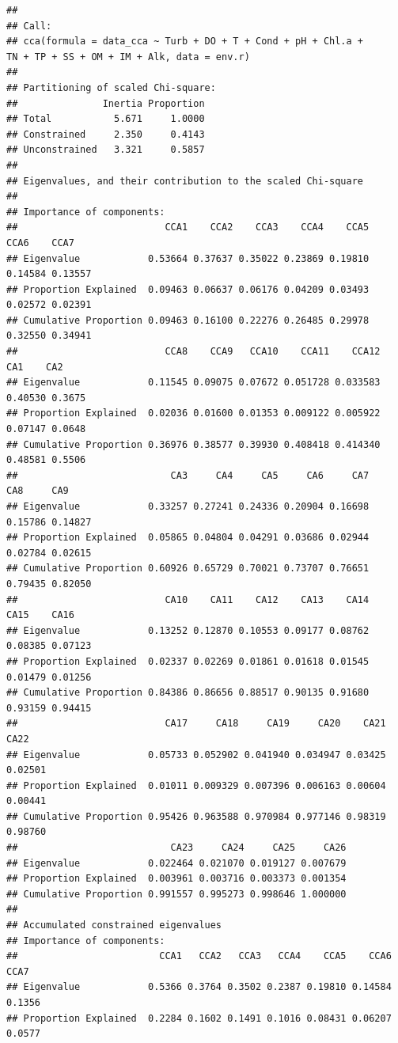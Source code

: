 \documentclass[
]{book}
\begin{document}
\begin{verbatim}
## 
## Call:
## cca(formula = data_cca ~ Turb + DO + T + Cond + pH + Chl.a +      TN + TP + SS + OM + IM + Alk, data = env.r) 
## 
## Partitioning of scaled Chi-square:
##               Inertia Proportion
## Total           5.671     1.0000
## Constrained     2.350     0.4143
## Unconstrained   3.321     0.5857
## 
## Eigenvalues, and their contribution to the scaled Chi-square 
## 
## Importance of components:
##                          CCA1    CCA2    CCA3    CCA4    CCA5    CCA6    CCA7
## Eigenvalue            0.53664 0.37637 0.35022 0.23869 0.19810 0.14584 0.13557
## Proportion Explained  0.09463 0.06637 0.06176 0.04209 0.03493 0.02572 0.02391
## Cumulative Proportion 0.09463 0.16100 0.22276 0.26485 0.29978 0.32550 0.34941
##                          CCA8    CCA9   CCA10    CCA11    CCA12     CA1    CA2
## Eigenvalue            0.11545 0.09075 0.07672 0.051728 0.033583 0.40530 0.3675
## Proportion Explained  0.02036 0.01600 0.01353 0.009122 0.005922 0.07147 0.0648
## Cumulative Proportion 0.36976 0.38577 0.39930 0.408418 0.414340 0.48581 0.5506
##                           CA3     CA4     CA5     CA6     CA7     CA8     CA9
## Eigenvalue            0.33257 0.27241 0.24336 0.20904 0.16698 0.15786 0.14827
## Proportion Explained  0.05865 0.04804 0.04291 0.03686 0.02944 0.02784 0.02615
## Cumulative Proportion 0.60926 0.65729 0.70021 0.73707 0.76651 0.79435 0.82050
##                          CA10    CA11    CA12    CA13    CA14    CA15    CA16
## Eigenvalue            0.13252 0.12870 0.10553 0.09177 0.08762 0.08385 0.07123
## Proportion Explained  0.02337 0.02269 0.01861 0.01618 0.01545 0.01479 0.01256
## Cumulative Proportion 0.84386 0.86656 0.88517 0.90135 0.91680 0.93159 0.94415
##                          CA17     CA18     CA19     CA20    CA21    CA22
## Eigenvalue            0.05733 0.052902 0.041940 0.034947 0.03425 0.02501
## Proportion Explained  0.01011 0.009329 0.007396 0.006163 0.00604 0.00441
## Cumulative Proportion 0.95426 0.963588 0.970984 0.977146 0.98319 0.98760
##                           CA23     CA24     CA25     CA26
## Eigenvalue            0.022464 0.021070 0.019127 0.007679
## Proportion Explained  0.003961 0.003716 0.003373 0.001354
## Cumulative Proportion 0.991557 0.995273 0.998646 1.000000
## 
## Accumulated constrained eigenvalues
## Importance of components:
##                         CCA1   CCA2   CCA3   CCA4    CCA5    CCA6   CCA7
## Eigenvalue            0.5366 0.3764 0.3502 0.2387 0.19810 0.14584 0.1356
## Proportion Explained  0.2284 0.1602 0.1491 0.1016 0.08431 0.06207 0.0577

\end{verbatim}
\end{document}
